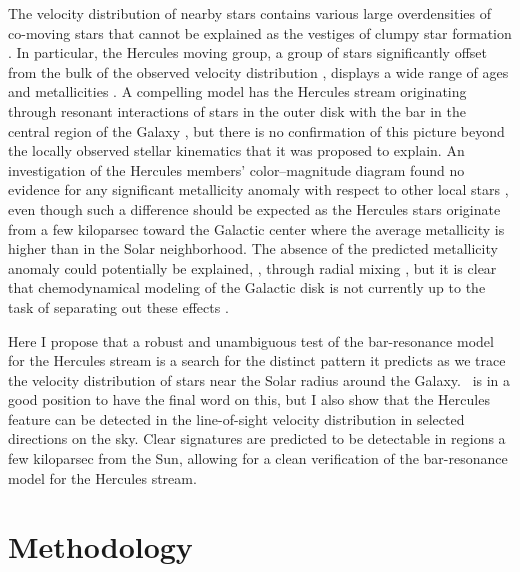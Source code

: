 The velocity distribution of nearby stars contains various large
overdensities of co-moving stars that cannot be explained as the
vestiges of clumpy star formation \citep[\eg,][]{Bovy10a}. In
particular, the Hercules moving group, a group of stars significantly
offset from the bulk of the observed velocity distribution
\citep[\eg,][see
  \figurename~\ref{fig:obs}]{1998AJ....115.2384D,Bovyveldist},
displays a wide range of ages and metallicities
\citep{Blaauw70a,raboud98a,caloi99a,Bensby07a,Bovy10a}. A compelling
model has the Hercules stream originating through resonant
interactions of stars in the outer disk with the bar in the central
region of the Galaxy \citep{dehnen00a,fux01a}, but there is no
confirmation of this picture beyond the locally observed stellar
kinematics that it was proposed to explain. An investigation of the
Hercules members' color--magnitude diagram found no evidence for any
significant metallicity anomaly with respect to other local stars
\citep{Bovy10a}, even though such a difference should be expected as
the Hercules stars originate from a few kiloparsec toward the Galactic
center where the average metallicity is higher than in the Solar
neighborhood. The absence of the predicted metallicity anomaly could
potentially be explained, \eg, through radial mixing
\citep{sellwood02a}, but it is clear that chemodynamical modeling of
the Galactic disk is not currently up to the task of separating out
these effects \citep[\eg,][]{samland03a,roskar08a}.

Here I propose that a robust and unambiguous test of the bar-resonance
model for the Hercules stream is a search for the distinct pattern it
predicts as we trace the velocity distribution of stars near the Solar
radius around the Galaxy. \Gaia\ is in a good position to have the
final word on this, but I also show that the Hercules feature can be
detected in the line-of-sight velocity distribution in selected
directions on the sky. Clear signatures are predicted to be detectable
in regions a few kiloparsec from the Sun, allowing for a clean
verification of the bar-resonance model for the Hercules stream.


\section{Methodology}\label{sec:method}

